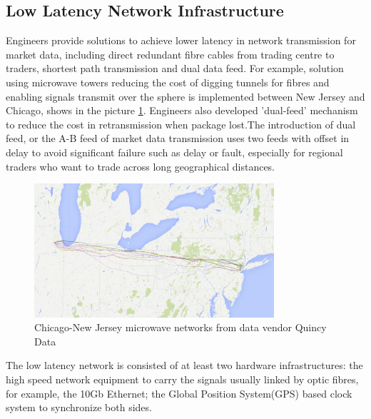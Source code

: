\documentclass[11pt,openright,a4paper]{report}
\begin{document}
\subsection{Low Latency Network Infrastructure}
Engineers provide solutions to achieve lower latency in network transmission for market data, including direct redundant fibre cables from trading centre to traders, shortest path transmission and dual data feed. For example, solution using microwave towers reducing the cost of digging tunnels for fibres and enabling signals transmit over the sphere is implemented between New Jersey and Chicago\cite{htfbackyard}, shows in the picture \ref{fig:2}. Engineers also developed 'dual-feed' mechanism to reduce the cost in retransmission when package lost\cite{zusman1999fault}.The introduction of dual feed, or the A-B feed of market data transmission uses two feeds with offset in delay to avoid significant failure such as delay or fault, especially for regional traders who want to trade across long geographical distances. \\
\begin{figure}[htbp]
\centering\includegraphics[width=3.5in]{picture/newyork-chicago.jpg}
\caption{Chicago-New Jersey microwave networks from data vendor Quincy Data}
\label{fig:2}
\end{figure}
The low latency network is consisted of at least two hardware infrastructures: the high speed network equipment to carry the signals usually linked by optic fibres, for example, the 10Gb Ethernet; the Global Position System(GPS) based clock system to synchronize both sides\cite{brook2015low}.
\end{document}
